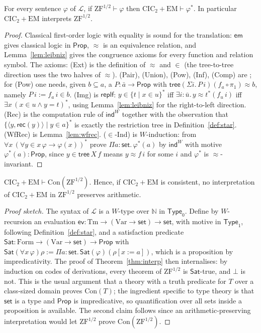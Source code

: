 \documentclass[10pt]{article}
\newcommand{\N}{\mathbb{N}}
\newcommand{\Prop}{\mathsf{Prop}}
\newcommand{\Type}{\mathsf{Type}}
\newcommand{\CIC}{\mathrm{CIC}}
\newcommand{\ZFh}{\mathrm{ZF}^{1/2}}
\newcommand{\EM}{\mathrm{EM}}
\newcommand{\Con}{\mathrm{Con}}
\newcommand{\rec}{\mathsf{rec}}
\newcommand{\Lang}{\mathcal L}
\newcommand{\Terms}{\mathrm{Tm}}
\begin{document}
\begin{theorem}\label{thm:interp}
For every sentence $\varphi$ of $\Lang$, if $\ZFh\vdash\varphi$ then
$\CIC_2+\EM\vdash\varphi^*$. In particular $\CIC_2+\EM$ interprets
$\ZFh$.
\end{theorem}
\begin{proof}
Classical first-order logic with equality is sound for the translation:
$\mathsf{em}$ gives classical logic in $\Prop$, $\approx$ is an
equivalence relation, and Lemma~\ref{lem:leibniz} gives the congruence
axioms for every function and relation symbol. The axioms: (Ext) is
the definition of $\approx$ and $\in$ (the tree-to-tree direction uses
the two halves of $\approx$). (Pair), (Union), (Pow), (Inf), (Comp) are
\cite{werner97,barras10}; for (Pow) one needs, given $b\subseteq a$, a
$P:\bar a\to\Prop$ with $\mathsf{tree}(\Sigma i.\,P\,i)(f_a\circ\pi_1)\approx b$,
namely $P\,i:=f_a\,i\in b$. (Img) is $\mathsf{replf}$: $y\in\{t\mid x\in u\}^*$
iff $\exists i{:}\bar u.\,y\approx t^*(f_u\,i)$ iff $\exists x\,(x\in u\wedge y=t)^*$,
using Lemma~\ref{lem:leibniz} for the right-to-left direction. (Rec) is
the computation rule of $\mathsf{ind}^W$ together with the observation
that $\{\langle y,\rec(y)\rangle\mid y\in a\}^*$ is exactly the restriction
tree in Definition~\ref{def:star}. (WfRec) is Lemma~\ref{lem:wfrec}.
($\in$-Ind) is $W$-induction: from $\forall x\,(\forall y{\in}x\,\varphi\to\varphi(x))^*$
prove $\Pi a{:}\mathsf{set}.\,\varphi^*(a)$ by $\mathsf{ind}^W$ with
motive $\varphi^*(a):\Prop$, since $y\in\mathsf{tree}\,X\,f$ means
$y\approx f\,i$ for some $i$ and $\varphi^*$ is $\approx$-invariant.
\end{proof}

\begin{proposition}\label{prop:con}
$\CIC_2+\EM\vdash\Con(\ZFh)$. Hence, if $\CIC_2+\EM$ is consistent, no
interpretation of $\CIC_2+\EM$ in $\ZFh$ preserves arithmetic.
\end{proposition}
\begin{proof}[Proof sketch]
The syntax of $\Lang$ is a $W$-type over $\N$ in $\Type_0$. Define by
$W$-recursion an evaluation
$\mathsf{ev}:\Terms\to(\mathrm{Var}\to\mathsf{set})\to\mathsf{set}$, with
motive in $\Type_1$, following Definition~\ref{def:star}, and a
satisfaction predicate $\mathsf{Sat}:\mathrm{Form}\to(\mathrm{Var}\to\mathsf{set})\to\Prop$
with $\mathsf{Sat}(\forall x\,\varphi)\rho:=\Pi a{:}\mathsf{set}.\,\mathsf{Sat}(\varphi)(\rho[x{:=}a])$,
which is a proposition by impredicativity. The proof of
Theorem~\ref{thm:interp} then internalises: by induction on codes of
derivations, every theorem of $\ZFh$ is $\mathsf{Sat}$-true, and $\bot$ is
not. This is the usual argument that a theory with a truth predicate for
$T$ over a class-sized domain proves $\Con(T)$; the ingredient specific
to type theory is that $\mathsf{set}$ is a type and $\Prop$ is
impredicative, so quantification over all sets inside a proposition is
available. The second claim follows since an arithmetic-preserving
interpretation would let $\ZFh$ prove $\Con(\ZFh)$.
\end{proof}
\end{document}
